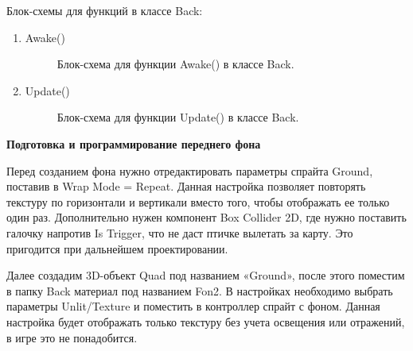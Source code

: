 \documentclass[14pt, oneside]{altsu-report}
\begin{document}
Блок-схемы для функций в классе Back:
\begin{enumerate}
\item Awake() 

\begin{figure}[H]
\caption{Блок-схема для функции Awake() в классе Back.}
\end{figure}

\item Update()

\begin{figure}[H]
\caption{Блок-схема для функции Update() в классе Back.}
\end{figure}

\end{enumerate}

\textbf{Подготовка и программирование переднего фона}

Перед созданием фона нужно отредактировать параметры спрайта Ground, поставив в Wrap Mode = Repeat. Данная настройка позволяет повторять текстуру по горизонтали и вертикали вместо того, чтобы отображать ее только один раз. Дополнительно нужен компонент Box Collider 2D, где нужно поставить галочку напротив Is Trigger, что не даст птичке вылетать за карту. Это пригодится при дальнейшем проектировании.

Далее создадим 3D-объект Quad под названием «Ground», после этого поместим в папку Back материал под названием Fon2. В настройках необходимо выбрать параметры Unlit/Texture и поместить в контроллер спрайт с фоном. Данная настройка будет отображать только текстуру без учета освещения или отражений, в игре это не понадобится. 
\end{document}
